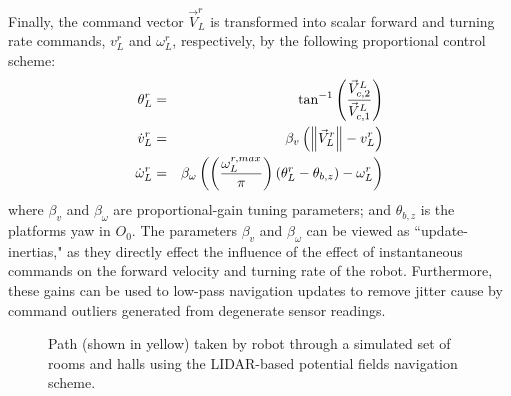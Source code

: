 			Finally, the command vector $\vec{V}_{L}^{r}$ is transformed into scalar forward and turning rate commands, ${v}_{L}^{r}$ and $\omega_{L}^{r}$, respectively, by the following proportional control scheme:
				\begin{eqnarray}
				\theta_{L}^{r} 			&=& \tan^{-1}\left( \frac{\vec{V}_{c,2}^{L} }{\vec{V}_{c,1}^{L}} \right) \nonumber\\
				\dot{v}_{L}^{r} 			&=& \beta_{v} \left( \left\lVert \vec{V}_{L}^{r} \right\rVert - v_{L}^{r} \right) \nonumber \\
				\dot{\omega}_{L}^{r} 	&=& \beta_{\omega} \left( \left( \frac{ \omega_{L}^{r,max} }{\pi} \right) \left(  \theta_{L}^{r} - \theta_{b,z} \right) - \omega_{L}^{r} \right)
				\end{eqnarray}
			where $\beta_{v}$ and $\beta_{\omega}$ are proportional-gain tuning parameters; and $\theta_{b,z}$ is the platforms yaw in $O_{0}$. The parameters $\beta_{v}$ and $\beta_{\omega}$ can be viewed as ``update-inertias," as they directly effect the influence of the effect of instantaneous commands on the forward velocity and turning rate of the robot. Furthermore, these gains can be used to low-pass navigation updates to remove jitter cause by command outliers generated from degenerate sensor readings.
				\begin{figure}[t!]
					\centering
					\caption{Path (shown in yellow) taken by robot through a simulated set of rooms and halls using the LIDAR-based potential fields navigation scheme.}
					\label{fig::potential_field_results}
				\end{figure}

